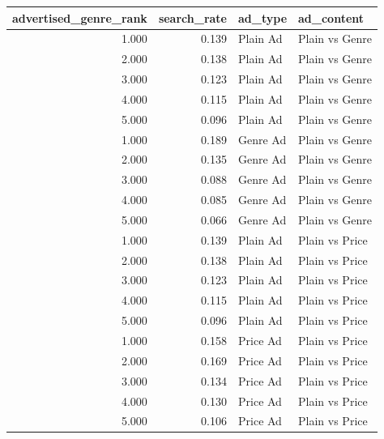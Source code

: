 \begin{tabular}{rrll}
\toprule
advertised_genre_rank & search_rate & ad_type & ad_content \\
\midrule
1.000 & 0.139 & Plain Ad & Plain vs Genre \\
2.000 & 0.138 & Plain Ad & Plain vs Genre \\
3.000 & 0.123 & Plain Ad & Plain vs Genre \\
4.000 & 0.115 & Plain Ad & Plain vs Genre \\
5.000 & 0.096 & Plain Ad & Plain vs Genre \\
1.000 & 0.189 & Genre Ad & Plain vs Genre \\
2.000 & 0.135 & Genre Ad & Plain vs Genre \\
3.000 & 0.088 & Genre Ad & Plain vs Genre \\
4.000 & 0.085 & Genre Ad & Plain vs Genre \\
5.000 & 0.066 & Genre Ad & Plain vs Genre \\
1.000 & 0.139 & Plain Ad & Plain vs Price \\
2.000 & 0.138 & Plain Ad & Plain vs Price \\
3.000 & 0.123 & Plain Ad & Plain vs Price \\
4.000 & 0.115 & Plain Ad & Plain vs Price \\
5.000 & 0.096 & Plain Ad & Plain vs Price \\
1.000 & 0.158 & Price Ad & Plain vs Price \\
2.000 & 0.169 & Price Ad & Plain vs Price \\
3.000 & 0.134 & Price Ad & Plain vs Price \\
4.000 & 0.130 & Price Ad & Plain vs Price \\
5.000 & 0.106 & Price Ad & Plain vs Price \\
\bottomrule
\end{tabular}
